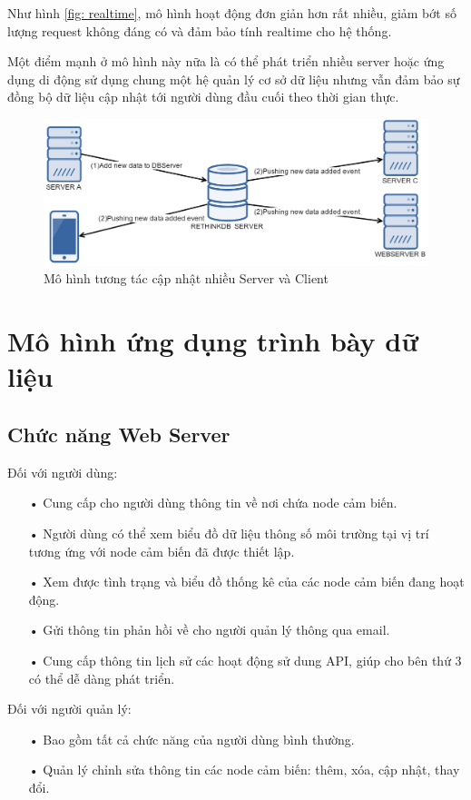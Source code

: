 Như hình \ref{fig: realtime}, mô hình hoạt động đơn giản hơn rất nhiều, giảm bớt số lượng request không đáng có và đảm bảo tính realtime cho hệ thống.

Một điểm mạnh ở mô hình này nữa là có thể phát triển nhiều server hoặc ứng dụng di động sử dụng chung một hệ quản lý cơ sở dữ liệu nhưng vẫn đảm bảo sự đồng bộ dữ liệu cập nhật tới người dùng đầu cuối theo thời gian thực.
\begin{figure}[H]
	\centering    
	\includegraphics[width=1.0\textwidth]{multiserver}
	\caption[Mô hình tương tác cập nhật nhiều Server]{Mô hình tương tác cập nhật nhiều Server và Client}
	\label{fig: multiserver}
\end{figure}
\newpage
\section{Mô hình ứng dụng trình bày dữ liệu}
\subsection*{Chức năng Web Server}
Đối với người dùng:
\begin{itemize}
\item[•] Cung cấp cho người dùng thông tin về nơi chứa node cảm biến.
\item[•] Người dùng có thể xem biểu đồ dữ liệu thông số môi trường tại vị trí tương ứng với node cảm biến đã được thiết lập.
\item[•] Xem được tình trạng và biểu đồ thống kê của các node cảm biến đang hoạt động.
\item[•] Gửi thông tin phản hồi về cho người quản lý thông qua email.
\item[•] Cung cấp thông tin lịch sử các hoạt động sử dung API, giúp cho bên thứ 3 có thể dễ dàng phát triển.
\end{itemize}

Đối với người quản lý:
\begin{itemize}
\item[•] Bao gồm tất cả chức năng của người dùng bình thường.
\item[•] Quản lý chỉnh sửa thông tin các node cảm biến: thêm, xóa, cập nhật, thay đổi.
\end{itemize}

